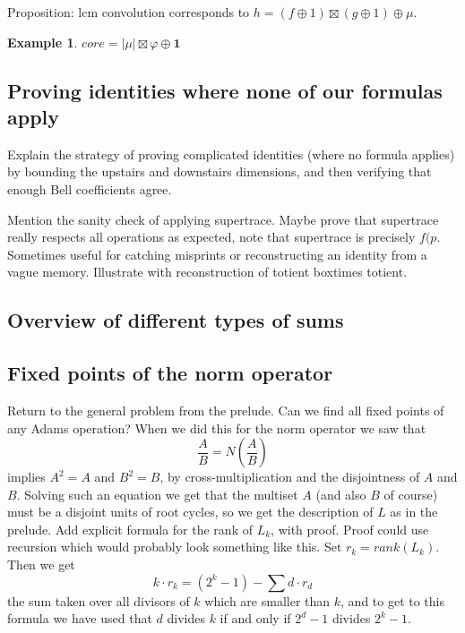 \documentclass[a4paper]{article}
\theoremstyle{definition}
\newtheorem{example}{Example}[section]
\theoremstyle{remark}
\begin{document}
Proposition: lcm convolution corresponds to $h = (f \oplus 1) \boxtimes (g \oplus 1) \oplus \mu $.





\begin{example}
$core = \vert \mu \vert \boxtimes \varphi \oplus \mathbf{1}$ 
\end{example}

\subsection{Proving identities where none of our formulas apply}

Explain the strategy of proving complicated identities (where no formula applies) by bounding the upstairs and downstairs dimensions, and then verifying that enough Bell coefficients agree.

Mention the sanity check of applying supertrace. Maybe prove that supertrace really respects all operations as expected, note that supertrace is precisely $f(p$. Sometimes useful for catching misprints or reconstructing an identity from a vague memory. Illustrate with reconstruction of totient boxtimes totient.


\subsection{Overview of different types of sums}



\subsection{Fixed points of the norm operator}

Return to the general problem from the prelude. Can we find all fixed points of any Adams operation? When we did this for the norm operator we saw that 
$$ \frac{A}{B} = N(\frac{A}{B})   $$
implies $A^2 = A$ and $B^2 = B$, by cross-multiplication and the disjointness of $A$ and $B$. Solving such an equation we get that the multiset $A$ (and also $B$ of course) must be a disjoint units of root cycles, so we get the description of $L$ as in the prelude. Add explicit formula for the rank of $L_k$, with proof. Proof could use recursion which would probably look something like this. Set $r_k = rank(L_k)$. Then we get
$$ k \cdot r_k = (2^k-1) - \sum d \cdot r_d    $$
the sum taken over all divisors of $k$ which are smaller than $k$, and to get to this formula we have used that $d$ divides $k$ if and only if $2^d-1$ divides $2^k-1$.
\end{document}
